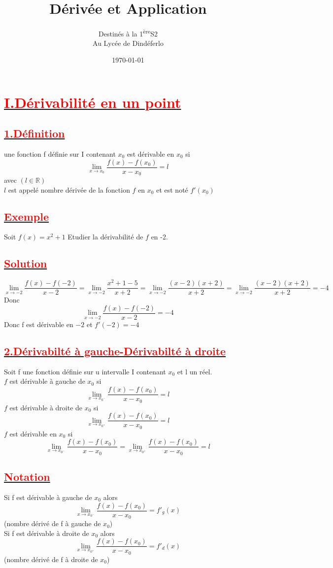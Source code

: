 \documentclass[12pt]{article}
\author{Destinés à la 1\textsuperscript{ère}S2\\Au Lycée de Dindéferlo}
\title{\textbf{Dérivée et Application}}
\date{\today}
\begin{document}
\maketitle
\newpage
\section*{\underline{\textbf{\textcolor{red}{I.Dérivabilité en un point}}}}
\subsection*{\underline{\textbf{\textcolor{red}{1.Définition}}}}
une fonction f définie sur I contenant $x_{0}$ est dérivable en $x_{0}$ si\\ 
\[\lim_{x \to x_{0}}\frac{f(x)-f(x_{0})}{x-x_{0}}=l\] avec $(l\in\mathbb{R})$\\
$l$ est appelé nombre dérivée de la fonction $f$ en $x_{0}$ et est noté $f'(x_{0})$
\subsection*{\underline{\textbf{\textcolor{red}{Exemple}}}}
Soit $f(x)=x^{2}+1$  Etudier la dérivabilité de $f$ en -2.\\
\subsection*{\underline{\textbf{\textcolor{red}{Solution}}}}
\[\lim_{x \to -2}\frac{f(x)-f(-2)}{x-2}=\lim_{x \to -2}\frac{x^{2}+1-5}{x+2}=
\lim_{x \to -2}\frac{(x-2)(x+2)}{x+2}=\lim_{x \to -2}\frac{(x-2)(x+2)}{x+2}=-4\]
Donc\[\lim_{x \to -2}\frac{f(x)-f(-2)}{x-2}=-4\]
Donc f est dérivable en $-2$ et $f'(-2)=-4$ 
\subsection*{\underline{\textbf{\textcolor{red}{2.Dérivabilté à gauche-Dérivabilté à droite}}}}
Soit f une fonction définie sur u intervalle I contenant $x_{0}$ et l un réel.\\
$f$ est dérivable à gauche de $x_{0}$ si\[\lim_{x \to x_{0^{-}}}\frac{f(x)-f(x_{0})}{x-x_{0}}=l\]
$f$ est dérivable à droite de $x_{0}$ si\[\lim_{x \to x_{0^{+}}}\frac{f(x)-f(x_{0})}{x-x_{0}}=l\]
$f$ est dérivable en $x_{0}$ si\[\lim_{x \to x_{0^{-}}}\frac{f(x)-f(x_{0})}{x-x_{0}}=\lim_{x \to x_{0^{+}}}\frac{f(x)-f(x_{0})}{x-x_{0}}=l\]
\subsection*{\underline{\textbf{\textcolor{red}{Notation}}}}
Si f est dérivable à gauche de $x_{0}$  alors\[\lim_{x \to x_{0^{-}}}\frac{f(x)-f(x_{0})}{x-x_{0}}=f'_{g}(x)\](nombre dérivé de f à gauche de $x_{0}$)\\
Si f est dérivable à droite de $x_{0}$  alors\[\lim_{x \to x_{0^{+}}}\frac{f(x)-f(x_{0})}{x-x_{0}}=f'_{d}(x)\](nombre dérivé de f à droite de $x_{0}$)
\end{document}
